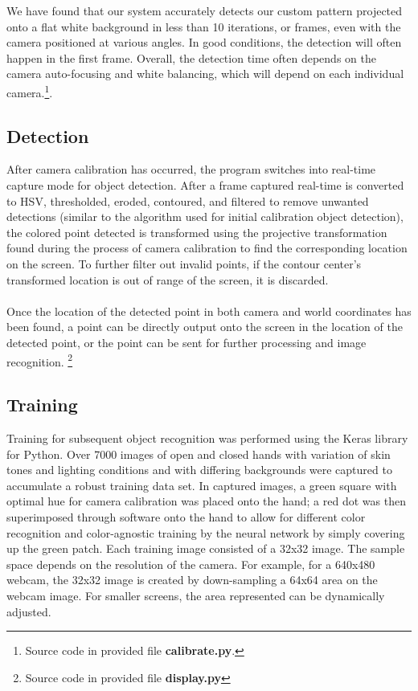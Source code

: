 \documentclass[twoside,twocolumn]{article}
\begin{document}
We have found that our system accurately detects our custom pattern projected onto a flat white background in less than 10 iterations, or frames, even with the camera positioned at various angles. In good conditions, the detection will often happen in the first frame. Overall, the detection time often depends on the camera auto-focusing and white balancing, which will depend on each individual camera.\footnote{Source code in provided file \textbf{calibrate.py}.}.

\subsection{Detection}
After camera calibration has occurred, the program switches into real-time capture mode for object detection. After a frame captured real-time is converted to HSV, thresholded, eroded, contoured, and filtered to remove unwanted detections (similar to the algorithm used for initial calibration object detection), the colored point detected is transformed using the projective transformation found during the process of camera calibration to find the corresponding location on the screen. To further filter out invalid points, if the contour center's transformed location is out of range of the screen, it is discarded.\\ \\ Once the location of the detected point in both camera and world coordinates has been found, a point can be directly output onto the screen in the location of the detected point, or the point can be sent for further processing and image recognition. \footnote{Source code in provided file \textbf{display.py}}

\subsection{Training}
Training for subsequent object recognition was performed using the Keras library for Python. Over 7000 images of open and closed hands with variation of skin tones and lighting conditions and with differing backgrounds were captured to accumulate a robust training data set. In captured images, a green square with optimal hue for camera calibration was placed onto the hand; a red dot was then superimposed through software onto the hand to allow for different color recognition and color-agnostic training by the neural network by simply covering up the green patch. Each training image consisted of a 32x32 image. The sample space depends on the resolution of the camera. For example, for a 640x480 webcam, the 32x32 image is created by down-sampling a 64x64 area on the webcam image. For smaller screens, the area represented can be dynamically adjusted.
\end{document}
